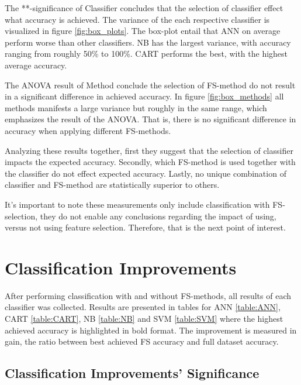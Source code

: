 

The **-significance of Classifier concludes that the selection of classifier effect what accuracy is achieved. The variance of the each respective classifier is visualized in figure \ref{fig:box_plots}. The box-plot entail that ANN on average perform worse than other classifiers. NB has the largest variance, with accuracy ranging from roughly 50\% to 100\%. CART performs the best, with the highest average accuracy.

The ANOVA result of Method conclude the selection of FS-method do not result in a significant difference in achieved accuracy. In figure \ref{fig:box_methods} all methods manifests a large variance but roughly in the same range, which emphasizes the result of the ANOVA. That is, there is no significant difference in accuracy when applying different FS-methods.

Analyzing these results together, first they suggest that the selection of classifier impacts the expected accuracy. Secondly, which FS-method is used together with the classifier do not effect expected accuracy. Lastly, no unique combination of classifier and FS-method are statistically superior to others.

It's important to note these measurements only include classification with FS-selection, they do not enable any conclusions regarding the impact of using, versus not using feature selection. Therefore, that is the next point of interest.



\FloatBarrier
\section{Classification Improvements}

After performing classification with and without FS-methods, all results of each classifier was collected. Results are presented in tables for ANN \ref{table:ANN}, CART \ref{table:CART}, NB \ref{table:NB} and SVM \ref{table:SVM} where the highest achieved accuracy is highlighted in bold format. The improvement is measured in gain, the ratio between best achieved FS accuracy and full dataset accuracy.



\FloatBarrier
\subsection{Classification Improvements' Significance}
\label{sec:Investigation_improvement}

